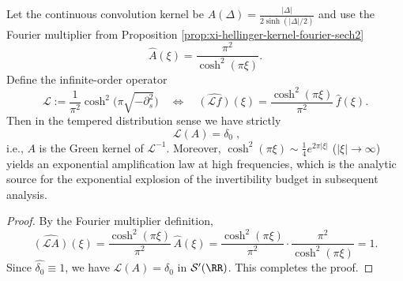 %

\begin{proposition}\label{prop:xi-hellinger-green-operator-cosh2}
Let the continuous convolution kernel be
\(
A(\Delta)=\frac{|\Delta|}{2\sinh(|\Delta|/2)}
\)
and use the Fourier multiplier from Proposition \ref{prop:xi-hellinger-kernel-fourier-sech2}
\[
\widehat A(\xi)=\frac{\pi^2}{\cosh^2(\pi\xi)}.
\]
Define the infinite-order operator
\[
\mathcal L:=\frac{1}{\pi^2}\cosh^{2}\!\bigl(\pi\sqrt{-\partial_s^{2}}\bigr)
\quad\Longleftrightarrow\quad
\widehat{(\mathcal L f)}(\xi)=\frac{\cosh^{2}(\pi\xi)}{\pi^2}\,\widehat f(\xi).
\]
Then in the tempered distribution sense we have strictly
\[
\boxed{\;\mathcal L(A)=\delta_0\;},
\]
i.e., \(A\) is the Green kernel of \(\mathcal L^{-1}\).
Moreover, \(\cosh^{2}(\pi\xi)\sim \tfrac14 e^{2\pi|\xi|}\) (\(|\xi|\to\infty\)) yields an exponential amplification law at high frequencies, which is the analytic source for the exponential explosion of the invertibility budget in subsequent analysis.
\end{proposition}
\begin{proof}
By the Fourier multiplier definition,
\[
\widehat{(\mathcal L A)}(\xi)
=\frac{\cosh^{2}(\pi\xi)}{\pi^2}\,\widehat A(\xi)
=\frac{\cosh^{2}(\pi\xi)}{\pi^2}\cdot\frac{\pi^2}{\cosh^{2}(\pi\xi)}
=1.
\]
Since \(\widehat{\delta_0}\equiv 1\), we have \(\mathcal L(A)=\delta_0\) in \(\mathcal S'(\RR)\). This completes the proof.
\end{proof}

